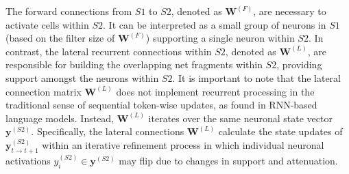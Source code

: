 \documentclass[12pt]{article}
\begin{document}
The forward connections from $S1$ to $S2$, denoted as $\boldsymbol{W}^{(F)}$, are necessary to activate cells within $S2$. It can be interpreted as a small group of neurons in $S1$ (based on the filter size of $\boldsymbol{W}^{(F)}$) supporting a single neuron within $S2$.
In contrast, the lateral recurrent connections within $S2$, denoted as $\boldsymbol{W}^{(L)}$, are responsible for building the overlapping net fragments within $S2$, providing support amongst the neurons within $S2$.
It is important to note that the lateral connection matrix $\boldsymbol{W}^{(L)}$ does not implement recurrent processing in the traditional sense of sequential token-wise updates, as found in  RNN-based language models. Instead, $\boldsymbol{W}^{(L)}$ iterates over the same neuronal state vector $\boldsymbol{y}^{(S2)}$.
Specifically, the lateral connections $\boldsymbol{W}^{(L)}$ calculate the state updates of $\boldsymbol{y}^{(S2)}_{t\rightarrow t+1}$ within an iterative refinement process in which individual neuronal activations ${y}_i^{(S2)} \in \boldsymbol{y}^{(S2)}$ may flip due to changes in support and attenuation.
\end{document}
